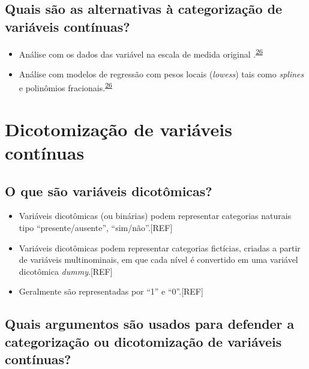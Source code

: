 \documentclass[
]{book}
\begin{document}
\hypertarget{quais-suxe3o-as-alternativas-uxe0-categorizauxe7uxe3o-de-variuxe1veis-contuxednuas}{%
\subsection{Quais são as alternativas à categorização de variáveis contínuas?}\label{quais-suxe3o-as-alternativas-uxe0-categorizauxe7uxe3o-de-variuxe1veis-contuxednuas}}

\begin{itemize}
\item
  Análise com os dados das variável na escala de medida original .\textsuperscript{\protect\hyperlink{ref-MacCallum2002}{26}}
\item
  Análise com modelos de regressão com pesos locais (\emph{lowess}) tais como \emph{splines} e polinômios fracionais.\textsuperscript{\protect\hyperlink{ref-MacCallum2002}{26}}
\end{itemize}

\hypertarget{dicotomizacao}{%
\section{Dicotomização de variáveis contínuas}\label{dicotomizacao}}

\hypertarget{o-que-suxe3o-variuxe1veis-dicotuxf4micas}{%
\subsection{O que são variáveis dicotômicas?}\label{o-que-suxe3o-variuxe1veis-dicotuxf4micas}}

\begin{itemize}
\item
  Variáveis dicotômicas (ou binárias) podem representar categorias naturais tipo ``presente/ausente'', ``sim/não''.{[}REF{]}
\item
  Variáveis dicotômicas podem representar categorias fictícias, criadas a partir de variáveis multinominais, em que cada nível é convertido em uma variável dicotômica \emph{dummy}.{[}REF{]}
\item
  Geralmente são representadas por ``1'' e ``0''.{[}REF{]}
\end{itemize}

\hypertarget{quais-argumentos-suxe3o-usados-para-defender-a-categorizauxe7uxe3o-ou-dicotomizauxe7uxe3o-de-variuxe1veis-contuxednuas}{%
\subsection{Quais argumentos são usados para defender a categorização ou dicotomização de variáveis contínuas?}\label{quais-argumentos-suxe3o-usados-para-defender-a-categorizauxe7uxe3o-ou-dicotomizauxe7uxe3o-de-variuxe1veis-contuxednuas}}
\end{document}
